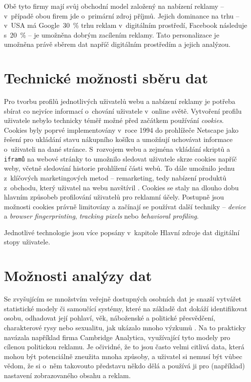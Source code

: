 Obě tyto firmy mají svůj obchodní model založený na nabízení reklamy -- v~případě obou firem jde o~primární zdroj příjmů. Jejich dominance na trhu -- v~USA má Google~30~\% trhu reklam \citep{google-ads} v~digitálním prostředí, Facebook následuje s~20~\% -- je umožněna dobrým zacílením reklamy. Tato personalizace je umožněna právě sběrem dat napříč digitálním prostředím a jejich analýzou.

\section{Technické možnosti sběru dat}

Pro tvorbu profilů jednotlivých uživatelů webu a nabízení reklamy je potřeba sbírat co nejvíce informací o~chování uživatele v~online světě. Vytvoření profilu uživatele nebylo technicky téměř možné před začátkem používání \textit{cookies}.\\
Cookies byly poprvé implementovány v~roce 1994 do prohlížeče Netscape jako řešení pro ukládání stavu nákupního košíku \citep{cookies-history} a umožňují uchovávat informace o~uživateli na dané stránce. S~rozvojem webu a zejména vkládání skriptů a \verb|iframů| na webové stránky to umožnilo sledovat uživatele skrze cookies napříč weby, včetně sledování historie prohlížení části webů.
To dále umožnilo jednu z~klíčových marketingových metod -- remarketing, tedy nabízení produktů z~obchodu, který uživatel na webu navštívil \citep{scott-cookies}. Cookies se staly na dlouho dobu hlavním způsobeb profilování uživatelů pro reklamní účely. Postupně jsou možnosti cookies právně limitovány a začínají se používat další techniky -- \textit{device} a \textit{browser fingerprinting}, \textit{tracking pixels} nebo \textit{behavioral profiling}.

Jednotlivé technologie jsou více popsány v~kapitole Hlavní zdroje dat digitální stopy uživatele.

\section{Možnosti analýzy dat}
Se zvyšujícím se množstvím veřejně dostupných osobních dat je snazší vytvářet statistické modely či samoučící systémy, které na základě dat dokáží identifikovat osobu, odhadovat její pohlaví, věk, náboženské a politické přesvědčení, charakterové rysy nebo sexualitu, jak ukázalo mnoho výzkumů \citep{big-5-predictions}.
Na to prakticky navázala například firma Cambridge Analytica, využívající tyto modely pro cílenou politickou reklamu. Je očividné, že to jsou často velmi citlivá data, která mohou být potenciálně zneužita mnoha způsoby, a uživatel si nemusí být vůbec vědom, že si o~něm takovouto představu někdo dělá a používá ji pro (například) nastavení zobrazovaného obsahu a reklam. 

